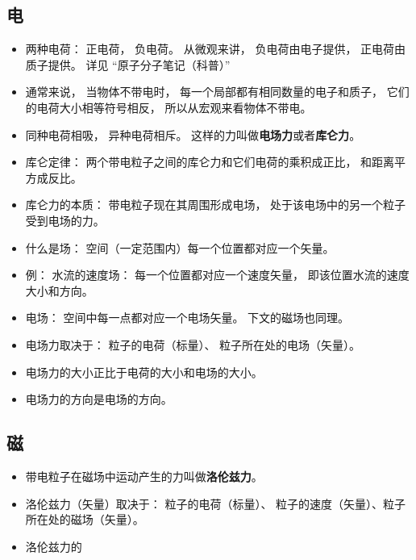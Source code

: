 
\begin{issues}
\issueDraft
\end{issues}

\subsection{电}
\begin{itemize}
\item 两种电荷： 正电荷， 负电荷。 从微观来讲， 负电荷由电子提供， 正电荷由质子提供。 详见 “原子分子笔记（科普）”
\item 通常来说， 当物体不带电时， 每一个局部都有相同数量的电子和质子， 它们的电荷大小相等符号相反， 所以从宏观来看物体不带电。
\item 同种电荷相吸， 异种电荷相斥。 这样的力叫做\textbf{电场力}或者\textbf{库仑力}。
\item 库仑定律： 两个带电粒子之间的库仑力和它们电荷的乘积成正比， 和距离平方成反比。
\item 库仑力的本质： 带电粒子现在其周围形成电场， 处于该电场中的另一个粒子受到电场的力。
\item 什么是场： 空间（一定范围内）每一个位置都对应一个矢量。
\item 例： 水流的速度场： 每一个位置都对应一个速度矢量， 即该位置水流的速度大小和方向。
\item 电场： 空间中每一点都对应一个电场矢量。 下文的磁场也同理。
\item 电场力取决于：  粒子的电荷（标量）、 粒子所在处的电场（矢量）。
\item 电场力的大小正比于电荷的大小和电场的大小。
\item 电场力的方向是电场的方向。
\end{itemize}

\subsection{磁}
\begin{itemize}
\item 带电粒子在磁场中运动产生的力叫做\textbf{洛伦兹力}。
\item 洛伦兹力（矢量）取决于： 粒子的电荷（标量）、 粒子的速度（矢量）、粒子所在处的磁场（矢量）。
\item 洛伦兹力的
\end{itemize}
